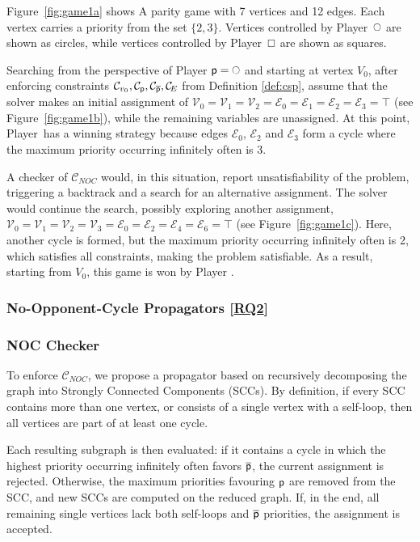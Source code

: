 \documentclass{article}
\begin{document}
Figure~\ref{fig:game1a} shows A parity game with 7 vertices and 12 edges. Each vertex carries a priority from the set $\{2,3\}$. Vertices controlled by Player~$\even$ are shown as circles, while vertices controlled by Player~$\odd$ are shown as squares.

Searching from the perspective of Player $\player = \even$ and starting at vertex $V_0$, after enforcing constraints $\mathcal{C}_{v_0}, \mathcal{C}_{\player}, \mathcal{C}_{\opponent}, \mathcal{C}_{\!E}$ from Definition \ref{def:csp}, assume that the solver makes an initial assignment of $\mathcal{V}_0 = \mathcal{V}_1 = \mathcal{V}_2 = \mathcal{E}_0 = \mathcal{E}_1 = \mathcal{E}_2 = \mathcal{E}_3 = \top$ (see Figure~\ref{fig:game1b}), while the remaining variables are unassigned. At this point, Player~\odd has a winning strategy because edges $\mathcal{E}_0$, $\mathcal{E}_2$ and $\mathcal{E}_3$ form a cycle where the maximum priority occurring infinitely often is 3. 

A checker of $\mathcal{C}_{N\!O\!C}$ would, in this situation, report unsatisfiability of the problem, triggering a backtrack and a search for an alternative assignment. The solver would continue the search, possibly exploring another assignment, $\mathcal{V}_0 = \mathcal{V}_1 = \mathcal{V}_2 = \mathcal{V}_3 = \mathcal{E}_0 = \mathcal{E}_2 = \mathcal{E}_4 = \mathcal{E}_6 = \top$ (see Figure~\ref{fig:game1c}). Here, another cycle is formed, but the maximum priority occurring infinitely often is 2, which satisfies all constraints, making the problem satisfiable. As a result, starting from $V_0$, this game is won by Player \even.

\subsubsection{No-Opponent-Cycle Propagators [\hyperref[sec:rq]{RQ2}]}

\subsubsection*{NOC Checker} \label{sec:nocchecker}
To enforce $\mathcal{C}_{\!N\!O\!C}$, we propose a propagator based on recursively decomposing the graph into Strongly Connected Components (SCCs). By definition, if every SCC contains more than one vertex, or consists of a single vertex with a self-loop, then all vertices are part of at least one cycle.

Each resulting subgraph is then evaluated: if it contains a cycle in which the highest priority occurring infinitely often favors $\opponent$, the current assignment is rejected. Otherwise, the maximum priorities favouring $\player$ are removed from the SCC, and new SCCs are computed on the reduced graph.
%
If, in the end, all remaining single vertices lack both self-loops and $\opponent$ priorities, the assignment is accepted.
\end{document}
